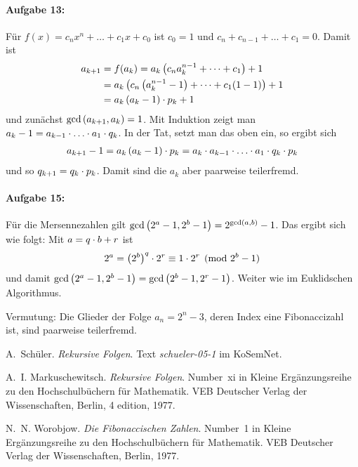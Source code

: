\documentclass[11pt,a4paper]{article}
\begin{document}
\paragraph{Aufgabe 13:}
Für $f(x)=c_nx^n+\dots+c_1x+c_0$ ist $c_0=1$ und $c_n+c_{n-1}+\dots+c_1=0$.
Damit ist
\begin{align*}
  a_{k+1}&=f(a_k)=a_k\left(c_na_k^{n-1}+\dots+c_1\right)+1\\
  &=a_k\left(c_n\left(a_k^{n-1}-1\right)+\dots+c_1(1-1)\right)+1\\
  &=a_k\left(a_k-1\right)\cdot p_k+1
\end{align*}
und zunächst $\gcd\left(a_{k+1},a_k\right)=1$.  Mit Induktion zeigt man
$a_k-1=a_{k-1}\m\dots\m a_1\m q_k$.  In der Tat, setzt man das oben ein, so
ergibt sich 
\begin{gather*}
  a_{k+1}-1=a_k\br{a_k-1}\m p_k=a_k\m a_{k-1}\m\dots\m a_1\m q_k\m p_k
\end{gather*}
und so $q_{k+1}=q_k\cdot p_k$.  Damit sind die $a_k$ aber paarweise
teilerfremd. 


\paragraph{Aufgabe 15:}
Für die Mersennezahlen gilt $\gcd\left(2^a-1,2^b-1\right)=2^{\gcd(a,b)}-1$.  Das
ergibt sich wie folgt: Mit $a=q\cdot b+r$ ist 
\begin{gather*}
  2^a=\left(2^b\right)^q\cdot 2^r\equiv 1\cdot 2^r \pmod{2^b-1}
\end{gather*}
und damit $\gcd\left(2^a-1,2^b-1\right)=\gcd\left(2^b-1,2^r-1\right)$.  Weiter wie im
Euklidschen Algorithmus.

Vermutung: Die Glieder der  Folge $a_n=2^n-3$, deren Index eine Fibonaccizahl
ist, sind paarweise teilerfremd.


\begin{thebibliography}{Wor77}

 A.~Schüler.  \newblock \emph{Rekursive Folgen}.  Text
  \emph{schueler-05-1} im KoSemNet.

 A.~I. Markuschewitsch.  \newblock
  \emph{{R}ekursive {F}olgen}.  \newblock Number~xi in Kleine
  Erg{\"a}nzungsreihe zu den Hochschulb{\"u}chern f{\"u}r Mathematik. VEB
  Deutscher Verlag der Wissenschaften, Berlin, 4 edition, 1977.

 N.~N. Worobjow.  \newblock \emph{Die Fibonaccischen
  Zahlen}.  \newblock Number~1 in Kleine Erg{\"a}nzungsreihe zu den
  Hochschulb{\"u}chern f{\"u}r Mathematik. VEB Deutscher Verlag der
  Wissenschaften, Berlin, 1977.

\end{thebibliography}
\end{document}
